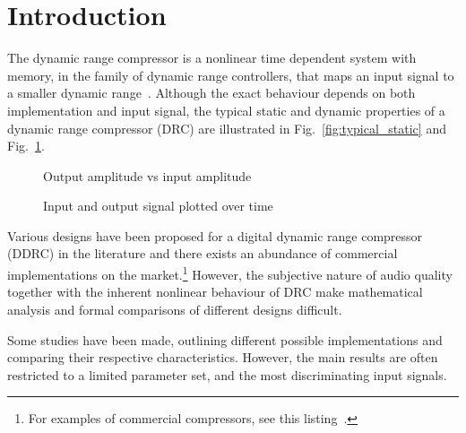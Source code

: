 \documentclass[../main2.tex]{subfiles}
\providecommand{\rootdir}{..}
\begin{document}
\section{Introduction}
The dynamic range compressor is a nonlinear time dependent system with memory, in the family of dynamic range controllers, that maps an input signal to a smaller dynamic range~\cite{dafx11}. Although the exact behaviour depends on both implementation and input signal, the typical static and dynamic properties of a dynamic range compressor (DRC) are illustrated in Fig.~\ref{fig:typical_static} and Fig.~\ref{fig:typical_envelope}.

\begin{figure}[ht]
\captionsetup{justification=centering}

\begin{minipage}[t]{.5\textwidth}
 \centering

\caption{Output amplitude vs input amplitude} 
\label{fig:typical_static}
\end{minipage}%
\begin{minipage}[t]{.5\textwidth}
\centering

\caption{Input and output signal plotted over time} 
\label{fig:typical_envelope}
\end{minipage}
\end{figure}

Various designs have been proposed for a digital dynamic range compressor (DDRC) in the literature and there exists an abundance of commercial implementations on the market.\footnote{For examples of commercial compressors, see this listing~\cite{commercial}.} However, the subjective nature of audio quality together with the inherent nonlinear behaviour of DRC make mathematical analysis and formal comparisons of different designs difficult. 

Some studies have been made, outlining different possible implementations and comparing their respective characteristics. However, the main results are often restricted to a limited parameter set, and the most discriminating input signals.


\end{document}

